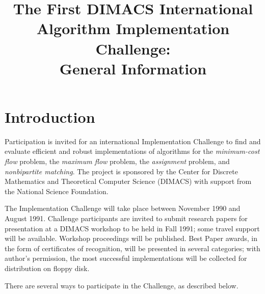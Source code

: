 \setlength{\topmargin}{-.5in}
\addtolength{\textheight}{1.5in}
\addtolength{\textwidth}{\evensidemargin}
\addtolength{\textwidth}{\oddsidemargin}
\setlength{\oddsidemargin}{.25in}
\setlength{\evensidemargin}{.25in}
\addtolength{\textwidth}{-1.0\oddsidemargin}
\addtolength{\textwidth}{-1.0\evensidemargin}

\setlength{\baselineskip}{20pt}

\title{
The First DIMACS International \\ 
Algorithm Implementation Challenge: \\
General Information 
}
\author{ } 
\maketitle 

\section{Introduction}

Participation is invited for an international Implementation Challenge 
to find and evaluate efficient and robust implementations of algorithms for 
the {\em minimum-cost flow} problem,
the {\em maximum flow} problem, the {\em assignment} problem, 
and {\em nonbipartite matching}. 
The project is sponsored by 
the Center for Discrete Mathematics and Theoretical 
Computer Science (DIMACS) with support from the National Science 
Foundation.

The Implementation Challenge will take place between November 1990 and
August 1991. Challenge participants are invited
to submit research papers for presentation at a DIMACS workshop to 
be held in Fall 1991;  some travel support will be available.  
Workshop proceedings will be published. 
Best Paper awards, in the form of certificates of recognition, will 
be presented in several categories;  with author's permission, the 
most successful implementations will be collected for distribution 
on floppy disk.  

There are several ways to participate in the Challenge, 
as described below. 

